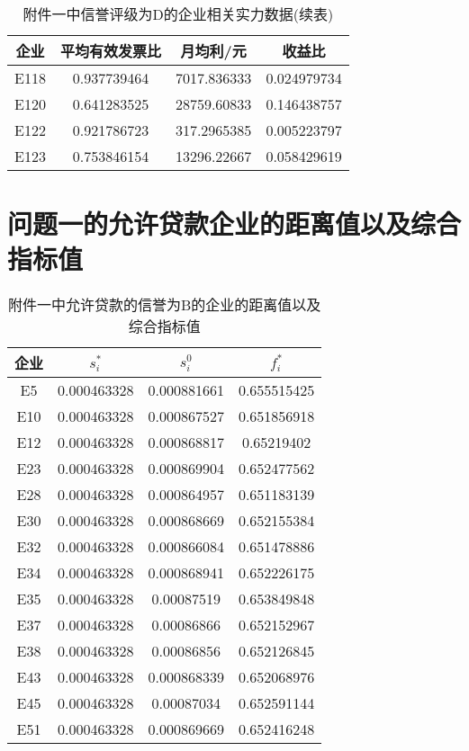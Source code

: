 \documentclass{cumcmthesis}
\begin{document}
\begin{appendices}
\begin{table}[H]   %
	\caption{附件一中信誉评级为D的企业相关实力数据(续表)} \centering
	\begin{tabular}{cccc}
		\toprule[1.5pt]
		企业 & 平均有效发票比     & 月均利/元           & 收益比          \\
		\midrule[1pt]
E118 & 0.937739464 & 7017.836333  & 0.024979734  \\
E120 & 0.641283525 & 28759.60833  & 0.146438757  \\
E122 & 0.921786723 & 317.2965385  & 0.005223797  \\
E123 & 0.753846154 & 13296.22667  & 0.058429619 \\
		\bottomrule[1.5pt]
\end{tabular}
\end{table}

\section{问题一的允许贷款企业的距离值以及综合指标值}

\begin{table}[H]   %
	\caption{附件一中允许贷款的信誉为B的企业的距离值以及综合指标值}\label{tab:011} \centering
	\begin{tabular}{cccc}
		\toprule[1.5pt]
		企业 & $s_i^*$    & $s_i^0$        & $f_i^*$         \\
		\midrule[1pt]
E5 & 0.000463328 & 0.000881661 & 0.655515425 \\ 
E10 & 0.000463328 & 0.000867527 & 0.651856918 \\ 
E12 & 0.000463328 & 0.000868817 & 0.65219402 \\ 
E23 & 0.000463328 & 0.000869904 & 0.652477562 \\ 
E28 & 0.000463328 & 0.000864957 & 0.651183139 \\ 
E30 & 0.000463328 & 0.000868669 & 0.652155384 \\ 
E32 & 0.000463328 & 0.000866084 & 0.651478886 \\ 
E34 & 0.000463328 & 0.000868941 & 0.652226175 \\ 
E35 & 0.000463328 & 0.00087519 & 0.653849848 \\ 
E37 & 0.000463328 & 0.00086866 & 0.652152967 \\ 
E38 & 0.000463328 & 0.00086856 & 0.652126845 \\ 
E43 & 0.000463328 & 0.000868339 & 0.652068976 \\ 
E45 & 0.000463328 & 0.00087034 & 0.652591144 \\ 
E51 & 0.000463328 & 0.000869669 & 0.652416248 \\ 


\end{tabular}
\end{table}
\end{appendices}
\end{document}
